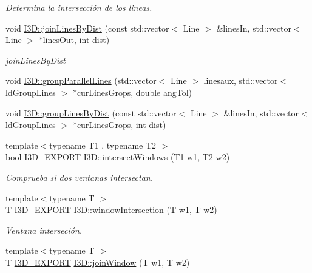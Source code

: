 \begin{DoxyCompactItemize}
\begin{DoxyCompactList}\small\item\em Determina la intersección de los lineas. \end{DoxyCompactList}\item 
void \hyperlink{group___geometric_entities_gac6db25c8f17cca3b2fd2f737efda6a5a}{I3\+D\+::join\+Lines\+By\+Dist} (const std\+::vector$<$ Line $>$ \&lines\+In, std\+::vector$<$ Line $>$ $\ast$lines\+Out, int dist)
\begin{DoxyCompactList}\small\item\em join\+Lines\+By\+Dist \end{DoxyCompactList}\item 
void \hyperlink{group___geometric_entities_gaa8733cce0398776f35f9dcdbb1a3c933}{I3\+D\+::group\+Parallel\+Lines} (std\+::vector$<$ Line $>$ linesaux, std\+::vector$<$ ld\+Group\+Lines $>$ $\ast$cur\+Lines\+Grops, double ang\+Tol)
\item 
void \hyperlink{group___geometric_entities_gadffdd08b45284c20785b162ee959f11f}{I3\+D\+::group\+Lines\+By\+Dist} (const std\+::vector$<$ Line $>$ \&lines\+In, std\+::vector$<$ ld\+Group\+Lines $>$ $\ast$cur\+Lines\+Grops, int dist)
\item 
{\footnotesize template$<$typename T1 , typename T2 $>$ }\\bool \hyperlink{defs_8h_a83f373279ee1ca96b4003c673142ec1d}{I3\+D\+\_\+\+E\+X\+P\+O\+RT} \hyperlink{group___geometric_entities_ga16ec870ad1dfb5178445d023231183e8}{I3\+D\+::intersect\+Windows} (T1 w1, T2 w2)
\begin{DoxyCompactList}\small\item\em Comprueba si dos ventanas intersectan. \end{DoxyCompactList}\item 
{\footnotesize template$<$typename T $>$ }\\T \hyperlink{defs_8h_a83f373279ee1ca96b4003c673142ec1d}{I3\+D\+\_\+\+E\+X\+P\+O\+RT} \hyperlink{group___geometric_entities_gaa929176ef49672b0bc0019c5fe58a017}{I3\+D\+::window\+Intersection} (T w1, T w2)
\begin{DoxyCompactList}\small\item\em Ventana interseción. \end{DoxyCompactList}\item 
{\footnotesize template$<$typename T $>$ }\\T \hyperlink{defs_8h_a83f373279ee1ca96b4003c673142ec1d}{I3\+D\+\_\+\+E\+X\+P\+O\+RT} \hyperlink{group___geometric_entities_ga1aa105cebf6692e4e42f666bc8dd94c1}{I3\+D\+::join\+Window} (T w1, T w2)

\end{DoxyCompactItemize}
